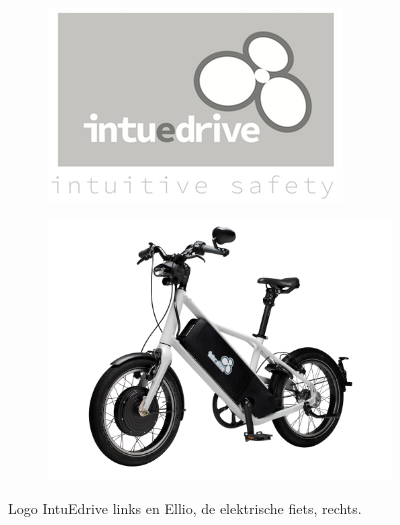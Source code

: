 \begin{figure}[!htp]
\centering
\begin{subfigure}{.45\textwidth}
  \centering
  \includegraphics[width=\linewidth]{images/logo_intuedrive.png}
\end{subfigure}%
\begin{subfigure}{.45\textwidth}
  \centering
  \includegraphics[width=\linewidth]{images/ellio_fiets.png}
\end{subfigure}%
\caption{Logo IntuEdrive links en Ellio, de elektrische fiets, rechts.}
\end{figure}

